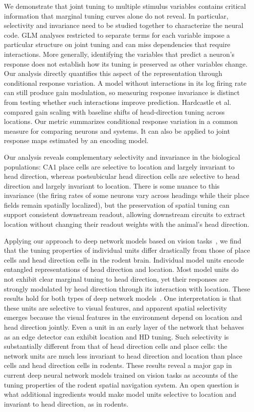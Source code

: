 \documentclass[11pt]{article}
\begin{document}
We demonstrate that joint tuning to multiple stimulus variables contains critical information that marginal tuning curves alone do not reveal. In particular, selectivity and invariance need to be studied together to characterize the neural code.
GLM analyses restricted to separate terms for each variable impose a particular structure on joint tuning and can miss dependencies that require interactions. More generally, identifying the variables that predict a neuron's response does not establish how its tuning is preserved as other variables change. Our analysis directly quantifies this aspect of the representation through conditional response variation. A model without interactions in its log firing rate can still produce gain modulation, so measuring response invariance is distinct from testing whether such interactions improve prediction. Hardcastle et al.~\cite{Hardcastle2017multiplexed} compared gain scaling with baseline shifts of head-direction tuning across locations. Our metric summarizes conditional response variation in a common measure for comparing neurons and systems. It can also be applied to joint response maps estimated by an encoding model.

Our analysis reveals complementary selectivity and invariance in the biological populations: CA1 place cells are selective to location and largely invariant to head direction, whereas postsubicular head direction cells are selective to head direction and largely invariant to location. There is some nuance to this invariance (the firing rates of some neurons vary across headings while their place fields remain spatially localized), but the preservation of spatial tuning can support consistent downstream readout, allowing downstream circuits to extract location without changing their readout weights with the animal's head direction.

Applying our approach to deep network models based on vision tasks~\cite{Luo2024,Gornet2024automated}, we find that the tuning properties of individual units differ drastically from those of place cells and head direction cells in the rodent brain.
Individual model units encode entangled representations of head direction and location. Most model units do not exhibit clear marginal tuning to head direction, yet their responses are strongly modulated by head direction through its interaction with location. These results hold for both types of deep network models~\cite{Luo2024,Gornet2024automated}.
One interpretation is that these units are selective to visual features, and apparent spatial selectivity emerges because the visual features in the environment depend on location and head direction jointly.
Even a unit in an early layer of the network that behaves as an edge detector can exhibit location and HD tuning. Such selectivity is substantially different from that of head direction cells and place cells: the network units are much less invariant to head direction and location than place cells and head direction cells in rodents.
These results reveal a major gap in current deep neural network models trained on vision tasks as accounts of the tuning properties of the rodent spatial navigation system. An open question is what additional ingredients would make model units selective to location and invariant to head direction, as in rodents.
\end{document}
